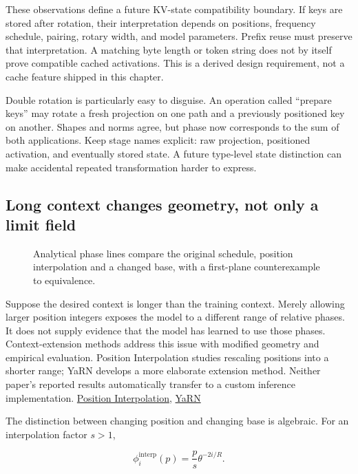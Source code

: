 \documentclass[
  10pt,
]{article}
\begin{document}
These observations define a future KV-state compatibility boundary. If
keys are stored after rotation, their interpretation depends on
positions, frequency schedule, pairing, rotary width, and model
parameters. Prefix reuse must preserve that interpretation. A matching
byte length or token string does not by itself prove compatible cached
activations. This is a derived design requirement, not a cache feature
shipped in this chapter.

Double rotation is particularly easy to disguise. An operation called
``prepare keys'' may rotate a fresh projection on one path and a
previously positioned key on another. Shapes and norms agree, but phase
now corresponds to the sum of both applications. Keep stage names
explicit: raw projection, positioned activation, and eventually stored
state. A future type-level state distinction can make accidental
repeated transformation harder to express.

\subsection{Long context changes geometry, not only a limit
field}\label{long-context-changes-geometry-not-only-a-limit-field}

\begin{figure}[H]\centering\resizebox{\linewidth}{!}{}\caption{Analytical phase lines compare the original schedule, position interpolation and a changed base, with a first-plane counterexample to equivalence.}\end{figure}

Suppose the desired context is longer than the training context. Merely
allowing larger position integers exposes the model to a different range
of relative phases. It does not supply evidence that the model has
learned to use those phases. Context-extension methods address this
issue with modified geometry and empirical evaluation. Position
Interpolation studies rescaling positions into a shorter range; YaRN
develops a more elaborate extension method. Neither paper's reported
results automatically transfer to a custom inference implementation.
\href{https://arxiv.org/abs/2306.15595}{Position Interpolation},
\href{https://arxiv.org/abs/2309.00071}{YaRN}

The distinction between changing position and changing base is
algebraic. For an interpolation factor \(s>1\),

\[
\phi_i^{\mathrm{interp}}(p)=\frac{p}{s}\theta^{-2i/R}.
\]
\end{document}
